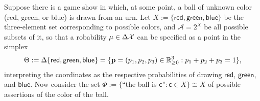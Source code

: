 \documentclass{article}
\begin{document}
\begin{examplex}
    \def\red{{\mathsf{red}}}
    \def\green{{\mathsf{green}}}
    \def\blue{{\mathsf{blue}}}
Suppose there is a game show in which, at some point, a ball of unknown color
(red, green, or blue) is drawn from an urn.
Let  $X := \{ \red,\green,\blue \}$ be the three-element set corresponding to possible colors,
 and $\mathcal A = 2^X$ be all possible subsets of it, so that a robability $\mu \in \Delta \mathcal X$
can be specified as a
point in the simplex 
$$\Theta
:= \Delta \{ \red,\green,\blue \}
= \{\mat p = (p_1, p_2, p_3)  \in \mathbb R^3_{\ge 0} : p_1 + p_2 + p_3 = 1\},$$
interpreting
the coordinates as the respective probabilities of drawing $\red$, $\green$, and $\blue$.
%
Now consider the set
 $\Phi := \{$``the ball is $\mathsf c$''$ : \mathsf c \in X\} \cong X$ of possible assertions of the color of the ball.


\end{examplex}
\end{document}
